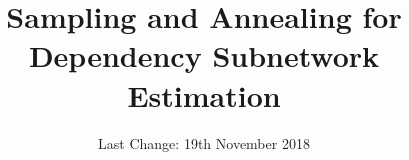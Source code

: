 \documentclass[a4paper, 10pt, oneside]{memoir}
\title				{Sampling and Annealing for Dependency Subnetwork Estimation}
\date				{Last Change: 19th November 2018}
\theoremstyle{break}
\begin{document}

\thesisfront
\maketitle
\pagestyle{thesis}




\printglossaries

\thesistoc
\thesismain






%
\thesisappendix
\thesisbib
\begin{appendices}
	 
\end{appendices}
\thesisback

\end{document}
